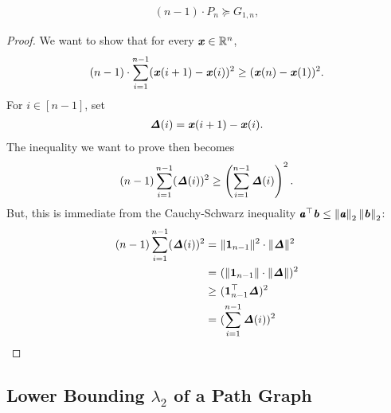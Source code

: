 \begin{lemma}
  \label{lem:pathineq}
\begin{align*}
(n-1) \cdot P_n \succeq G_{1,n},
\end{align*}
\end{lemma}
\begin{proof}

We want to show that for every $\boldsymbol{\mathit{x}} \in \mathbb{R}^n$,
\begin{align*}
(n-1) \cdot \sum_{i=1}^{n-1} ( \boldsymbol{\mathit{x}}(i+1) - \boldsymbol{\mathit{x}}(i) )^2 \geq ( \boldsymbol{\mathit{x}}(n) - \boldsymbol{\mathit{x}}(1) )^2.
\end{align*}
For $i \in [n-1]$, set
\begin{align*}
\boldsymbol{\mathit{\Delta}} (i) = \boldsymbol{\mathit{x}}(i+1) - \boldsymbol{\mathit{x}}(i).
\end{align*}
The inequality we want to prove then becomes
\begin{align*}
(n-1) \sum_{i=1}^{n-1} ( \boldsymbol{\mathit{\Delta}}(i) )^2 \geq \left( \sum_{i=1}^{n-1} \boldsymbol{\mathit{\Delta}} (i)  \right)^2.
\end{align*}
But, this is immediate from the Cauchy-Schwarz inequality
$\pmb{\mathit{a}}^{\top}\boldsymbol{\mathit{b}} \leq \left\| \pmb{\mathit{a}} \right\|_2\left\| \boldsymbol{\mathit{b}} \right\|_2$:
\begin{align*}
(n-1) \sum_{i=1}^{n-1} ( \boldsymbol{\mathit{\Delta}} (i) )^2
= & ~ \| \boldsymbol{1}_{n-1} \|^2 \cdot \| \boldsymbol{\mathit{\Delta}} \|^2 \\
= & ~ ( \| \boldsymbol{1}_{n-1} \| \cdot \| \boldsymbol{\mathit{\Delta}} \| )^2 \\
\geq & ~  ( \boldsymbol{1}^\top_{n-1} \boldsymbol{\mathit{\Delta}} )^2  \\
= & ~ (  \sum_{i=1}^{n-1} \boldsymbol{\mathit{\Delta}}(i) )^2
\end{align*}
\end{proof}

\subsection{Lower Bounding $\lambda_2$ of a Path Graph}

